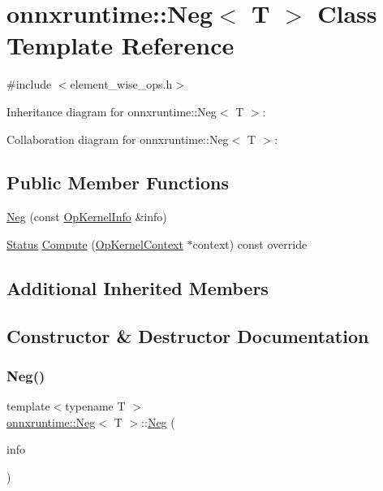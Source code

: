 \hypertarget{classonnxruntime_1_1Neg}{}\section{onnxruntime\+:\+:Neg$<$ T $>$ Class Template Reference}
\label{classonnxruntime_1_1Neg}


{\ttfamily \#include $<$element\+\_\+wise\+\_\+ops.\+h$>$}



Inheritance diagram for onnxruntime\+:\+:Neg$<$ T $>$\+:


Collaboration diagram for onnxruntime\+:\+:Neg$<$ T $>$\+:
\subsection*{Public Member Functions}
\begin{DoxyCompactItemize}
\item 
\mbox{\hyperlink{classonnxruntime_1_1Neg_ad9546ebeba11e7aa0ee1301733a3b5c6}{Neg}} (const \mbox{\hyperlink{classonnxruntime_1_1OpKernelInfo}{Op\+Kernel\+Info}} \&info)
\item 
\mbox{\hyperlink{classonnxruntime_1_1common_1_1Status}{Status}} \mbox{\hyperlink{classonnxruntime_1_1Neg_ae7346a503f7b94f000778037e7a92c69}{Compute}} (\mbox{\hyperlink{classonnxruntime_1_1OpKernelContext}{Op\+Kernel\+Context}} $\ast$context) const override
\end{DoxyCompactItemize}
\subsection*{Additional Inherited Members}


\subsection{Constructor \& Destructor Documentation}
\mbox{\label{classonnxruntime_1_1Neg_ad9546ebeba11e7aa0ee1301733a3b5c6}} 
\subsubsection{\texorpdfstring{Neg()}{Neg()}}
{\footnotesize\ttfamily template$<$typename T $>$ \\
\mbox{\hyperlink{classonnxruntime_1_1Neg}{onnxruntime\+::\+Neg}}$<$ T $>$\+::\mbox{\hyperlink{classonnxruntime_1_1Neg}{Neg}} (\begin{DoxyParamCaption}\item[{const \mbox{\hyperlink{classonnxruntime_1_1OpKernelInfo}{Op\+Kernel\+Info}} \&}]{info }\end{DoxyParamCaption})\hspace{0.3cm}{\ttfamily [inline]}}




